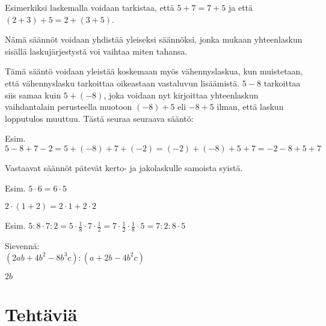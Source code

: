 
Esimerkiksi laskemalla voidaan tarkistaa, että $5+7=7+5$ ja että $(2+3)+5=2+(3+5)$.

Nämä säännöt voidaan yhdistää yleiseksi säännöksi, jonka mukaan yhteenlaskun sisällä laskujärjestystä voi vaihtaa miten tahansa.

Tämä sääntö voidaan yleistää koskemaan myös vähennyslaskua, kun muistetaan, että vähennyslasku tarkoittaa oikeastaan vastaluvun lisäämistä. $5-8$ tarkoittaa siis samaa kuin $5+(-8)$, joka voidaan nyt kirjoittaa yhteenlaskun vaihdantalain perusteella muotoon $(-8)+5$ eli $-8+5$ ilman, että laskun lopputulos muuttuu. Tästä seuraa seuraava sääntö:


Esim. $5-8+7-2=5+(-8)+7+(-2)=(-2)+(-8)+5+7=-2-8+5+7$

Vastaavat säännöt pätevät kerto- ja jakolaskulle samoista syistä.



Esim. $5 \cdot 6 = 6 \cdot 5$

$2 \cdot (1+2) = 2 \cdot 1 + 2 \cdot 2$


Esim. $5:8\cdot 7:2=5\cdot\frac18\cdot 7\cdot\frac12=7\cdot \frac12\cdot\frac18\cdot 5=7:2:8\cdot 5$

\begin{tehtava}
Sievennä: \\
$(2ab+4b^2-8b^3c):(a+2b-4b^2c)$
	\begin{vastaus}
	$2b$
	\end{vastaus}
\end{tehtava}
    

    \section*{Tehtäviä}
    
